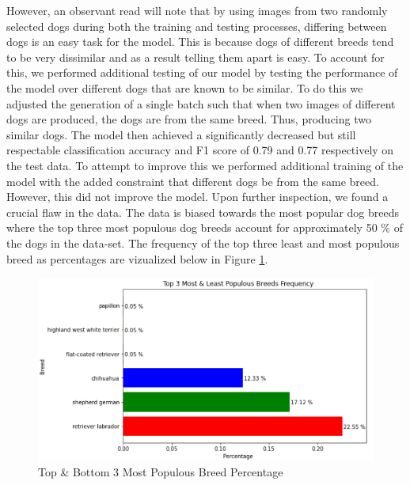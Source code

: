 \documentclass{article}
\begin{document}
However, an observant read will note that by using images from two randomly selected dogs during both the training and testing processes, differing between dogs is an easy task for the model.  This is because dogs of different breeds tend to be very dissimilar and as a result telling them apart is easy.  To account for this, we performed additional testing of our model by testing the performance of the model over different dogs that are known to be similar.  To do this we adjusted the generation of a single batch such that when two images of different dogs are produced, the dogs are from the same breed.  Thus, producing two similar dogs.  The model then achieved a significantly decreased but still respectable classification accuracy and F1 score of 0.79 and 0.77 respectively on the test data.   To attempt to improve this we performed additional training of the model with the added constraint that different dogs be from the same breed.  However, this did not improve the model.  Upon further inspection, we found a crucial flaw in the data.  The data is biased towards the most popular dog breeds where the top three most populous dog breeds account for approximately 50 \% of the dogs in the data-set.  The frequency of the top three least and most populous breed as percentages are vizualized below in Figure \ref{fig:x breed distr}.

\begin{figure}[]
\centering
	\includegraphics[scale=0.7]{final-report-images/breed_distr.png}
\caption{Top \& Bottom 3 Most Populous Breed Percentage}
\label{fig:x breed distr}
\end{figure}

\newpage
\end{document}
